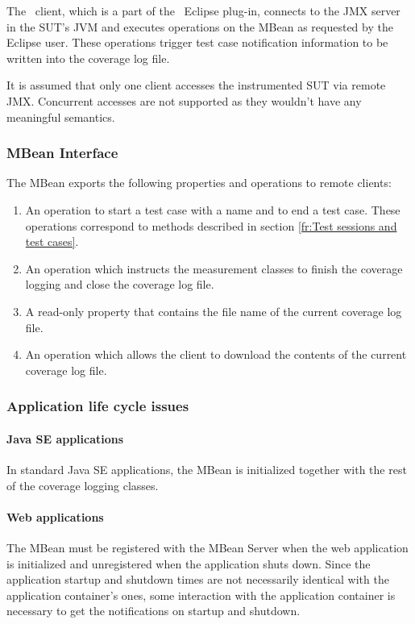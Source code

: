 The \gbt\ client, which is a part of the \gbt\ Eclipse plug-in,
connects to the JMX server in the SUT's JVM and executes operations on
the MBean as requested by the Eclipse user. These operations trigger
test case notification information to be written into the coverage
log file.

It is assumed that only one client accesses the instrumented SUT via
remote JMX. Concurrent accesses are not supported as they wouldn't have
any meaningful semantics.

\subsubsection{MBean Interface}
\label{fr:Live_MBean_Interface}
The MBean exports the following properties and operations to remote clients:
\begin{enumerate}
\item An operation to start a test case with a name and to end a test
  case. These operations correspond to methods described in section
  \ref{fr:Test sessions and test cases}.
\item An operation which instructs the measurement classes to finish
  the coverage logging and close the coverage log file.
\item A read-only property that contains the file name of the current
  coverage log file.
\item An operation which allows the client to download the contents of
  the current coverage log file.
\end{enumerate}

\subsubsection{Application life cycle issues}
\label{fr:Live_Application_Lifecycle_Issues}

\paragraph{Java SE applications}
In standard Java SE applications, the MBean is initialized together
with the rest of the coverage logging classes.

\paragraph{Web applications}
The MBean must be registered with the MBean Server when the web
application is initialized and unregistered when the application shuts
down. Since the application startup and shutdown times are not
necessarily identical with the application container's ones, some
interaction with the application container is necessary to get the
notifications on startup and shutdown.

